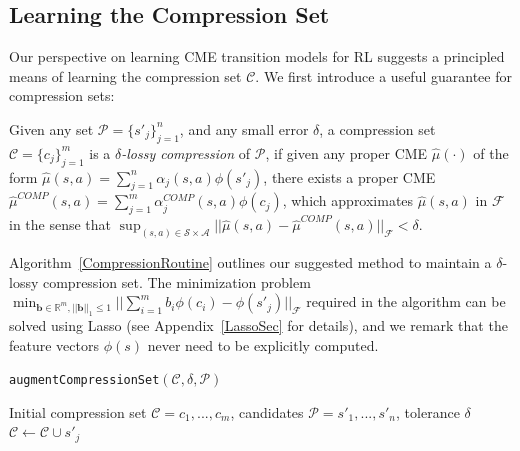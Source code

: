 \documentclass[letterpaper]{article}
\newenvironment{definition}[1][Definition]{\begin{trivlist}
\item[\hskip \labelsep {\bfseries #1}]}{\end{trivlist}}
\newcommand{\TibshiraniLasso}{tibshirani96regression}
\newcommand{\cC}{{\mathcal C}}
\newcommand{\cF}{{\mathcal F}}
\newcommand{\cA}{{\mathcal A}}
\newcommand{\cS}{{\mathcal S}}
\newcommand{\cP}{{\mathcal P}}
\newcommand{\R}{{\mathbb R}}
\begin{document}
\subsection{Learning the Compression Set} \label{learningCompression}

Our perspective on learning CME transition models for RL suggests a principled means of learning the compression set $\cC$. We first introduce a useful guarantee for compression sets:

\begin{definition} \label{lossyCompression}
Given any set $\cP = \{s'_j\}_{j=1}^n$, and any small error $\delta$, a compression set $\cC=\{c_j\}_{j=1}^m$ is a \emph{$\delta$-lossy compression} of $\cP$, if given any proper CME $\hat\mu(\cdot)$ of the form $\hat\mu(s,a) = \sum_{j=1}^n \alpha_j(s,a) \phi(s'_j)$, there exists a proper CME $\hat\mu^{COMP}(s,a) = \sum_{j=1}^m \alpha^{COMP}_j(s,a) \phi(c_j)$, which approximates $\hat\mu(s,a)$ in $\cF$ in the sense that $\sup_{(s,a)\in\cS\times\cA}||\hat\mu(s,a) - \hat\mu^{COMP}(s,a)||_\cF < \delta$.
\end{definition}

Algorithm~\ref{CompressionRoutine} outlines our suggested method to maintain a $\delta$-lossy compression set. The minimization problem $\min_{{\bm b}\in\R^m , ||{\bm b}||_1\le 1} ||\sum_{i=1}^m b_i \phi(c_i) - \phi(s'_j)||_{\cF}$ required in the algorithm can be solved using Lasso \citep{\TibshiraniLasso} (see Appendix~\ref{LassoSec} for details), and we remark that the feature vectors $\phi(s)$ never need to be explicitly computed.

\begin{algorithm}[htb]
   \caption{\texttt{augmentCompressionSet}$(\cC,\delta,\cP)$}
   \label{CompressionRoutine}
\begin{algorithmic}
     Initial compression set $\cC = {c_1,...,c_m}$, candidates $\cP = {s'_1,...,s'_n}$, tolerance $\delta$
	 \IF {$\min_{{\bm b}\in\R^m , ||{\bm b}||_1\le 1}\hspace{-0.6mm} ||\sum_{i=1}^m b_i \phi(c_i) \hspace{-0.6mm}-\hspace{-0.6mm} \phi(s'_j)||_{\cF} \hspace{-0.6mm}>\hspace{-0.6mm} \delta$}
	  $\cC \leftarrow \cC \cup s'_j$
   \ENDIF
	\ENDFOR
\end{algorithmic}
\end{algorithm}
\end{document}
